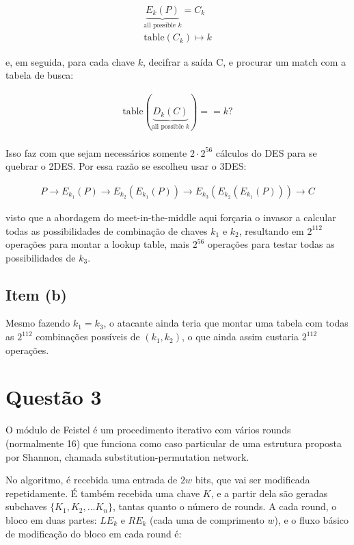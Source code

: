 \documentclass{article}
\begin{document}
\begin{gather*}
    \underbrace{E_k(P)}_{\text{all possible $k$}} = C_k \\
    \text{table}(C_k) \mapsto k
\end{gather*}

e, em seguida, para cada chave $k$, decifrar a saída C, e procurar um match com a tabela de busca:

\begin{gather*}
    \text{table}(\underbrace{D_k(C)}_{\text{all possible $k$}}) == k ? \\
\end{gather*}

Isso faz com que sejam necessários somente $2 \cdot 2^{56}$ cálculos do DES para se quebrar o 2DES. Por essa razão se escolheu usar o 3DES:

\begin{gather*}
    P \rightarrow E_{k_1}(P) \rightarrow E_{k_2}(E_{k_1}(P)) \rightarrow 
        E_{k_3}(E_{k_2}(E_{k_1}(P))) \rightarrow C
\end{gather*}

visto que a abordagem do meet-in-the-middle aqui forçaria o invasor a calcular todas as possibilidades de combinação de chaves $k_1$ e $k_2$, resultando em $2^{112}$ operações para montar a lookup table, mais $2^{56}$ operações para testar todas as possibilidades de $k_3$.

\subsection*{Item (b)}

Mesmo fazendo $k_1 = k_3$, o atacante ainda teria que montar uma tabela com todas as $2^{112}$ combinações possíveis de $(k_1, k_2)$, o que ainda assim custaria $2^{112}$ operações.

\section*{Questão 3}

O módulo de Feistel é um procedimento iterativo com vários rounds (normalmente 16) que funciona como caso particular de uma estrutura proposta por Shannon, chamada substitution-permutation network.

No algoritmo, é recebida uma entrada de $2w$ bits, que vai ser modificada repetidamente. É também recebida uma chave $K$, e a partir dela são geradas subchaves $\{K_1, K_2, ... K_n\}$, tantas quanto o número de rounds. A cada round, o bloco em duas partes: $LE_k$ e $RE_k$ (cada uma de comprimento $w$), e o fluxo básico de modificação do bloco em cada round é:
\end{document}
